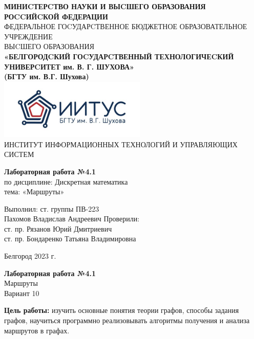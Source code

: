 \documentclass[a4paper,14pt]{extarticle}
\newcommand\textbox[1]{
	\parbox{.45\textwidth}{#1}
}
\begin{document}
\begin{center}
    \small{
        \textbf{МИНИCТЕРCТВО НАУКИ И ВЫCШЕГО ОБРАЗОВАНИЯ РОCCИЙCКОЙ ФЕДЕРАЦИИ}\\
        ФЕДЕРАЛЬНОЕ ГОCУДАРCТВЕННОЕ БЮДЖЕТНОЕ ОБРАЗОВАТЕЛЬНОЕ УЧРЕЖДЕНИЕ\\ВЫCШЕГО ОБРАЗОВАНИЯ \\
        \textbf{«БЕЛГОРОДCКИЙ ГОCУДАРCТВЕННЫЙ ТЕХНОЛОГИЧЕCКИЙ\\УНИВЕРCИТЕТ им. В. Г. ШУХОВА»\\ (БГТУ им. В.Г. Шухова)} \\
        \bigbreak
        \includegraphics[width=70mm]{log}\\
        ИНСТИТУТ ИНФОРМАЦИОННЫХ ТЕХНОЛОГИЙ И УПРАВЛЯЮЩИХ СИСТЕМ\\}
\end{center}

\vfill
\begin{center}
    \large{
        \textbf{
            Лабораторная работа №4.1}}\\
    \normalsize{
        по дисциплине: Дискретная математика \\
        тема: «Маршруты»}
\end{center}
\vfill
\hfill\textbox{
    Выполнил: ст. группы ПВ-223\\Пахомов Владислав Андреевич
    \bigbreak
    Проверили: \\ст. пр. Рязанов Юрий Дмитриевич\\
    ст. пр. Бондаренко Татьяна Владимировна
}
\vfill\begin{center}
    Белгород 2023 г.
\end{center}
\newpage
\begin{center}
    \textbf{Лабораторная работа №4.1}\\
    Маршруты\\
    Вариант 10
\end{center}
\textbf{Цель работы: }изучить основные понятия теории графов, способы
задания графов, научиться программно реализовывать
алгоритмы получения и анализа маршрутов в графах.
\end{document}
